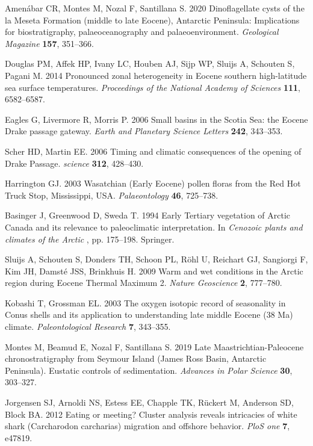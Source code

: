 \documentclass[]{rsos}%
\begin{document}
\begin{thebibliography}{99}
Amen{\'{a}}bar CR, Montes M, Nozal F, Santillana S. 2020  {Dinoflagellate cysts
  of the la Meseta Formation (middle to late Eocene), Antarctic Peninsula:
  Implications for biostratigraphy, palaeoceanography and palaeoenvironment}.
  {\em Geological Magazine} \textbf{157}, 351--366.

Douglas PM, Affek HP, Ivany LC, Houben AJ, Sijp WP, Sluijs A, Schouten S,
  Pagani M. 2014  Pronounced zonal heterogeneity in Eocene southern
  high-latitude sea surface temperatures. {\em Proceedings of the National
  Academy of Sciences} \textbf{111}, 6582--6587.

Eagles G, Livermore R, Morris P. 2006  Small basins in the Scotia Sea: the
  Eocene Drake passage gateway. {\em Earth and Planetary Science Letters}
  \textbf{242}, 343--353.

Scher HD, Martin EE. 2006  Timing and climatic consequences of the opening of
  Drake Passage. {\em science} \textbf{312}, 428--430.

Harrington GJ. 2003  {Wasatchian (Early Eocene) pollen floras from the Red Hot
  Truck Stop, Mississippi, USA}. {\em Palaeontology} \textbf{46}, 725--738.

Basinger J, Greenwood D, Sweda T. 1994  Early Tertiary vegetation of Arctic
  Canada and its relevance to paleoclimatic interpretation. In {\em Cenozoic
  plants and climates of the Arctic} ,  pp. 175--198. Springer.

Sluijs A, Schouten S, Donders TH, Schoon PL, R{\"o}hl U, Reichart GJ, Sangiorgi
  F, Kim JH, Damst{\'e} JSS, Brinkhuis H. 2009  Warm and wet conditions in the
  Arctic region during Eocene Thermal Maximum 2. {\em Nature Geoscience}
  \textbf{2}, 777--780.

Kobashi T, Grossman EL. 2003  The oxygen isotopic record of seasonality in
  Conus shells and its application to understanding late middle Eocene (38 Ma)
  climate. {\em Paleontological Research} \textbf{7}, 343--355.

Montes M, Beamud E, Nozal F, Santillana S. 2019  Late Maastrichtian-Paleocene
  chronostratigraphy from Seymour Island (James Ross Basin, Antarctic
  Peninsula). Eustatic controls of sedimentation. {\em Advances in Polar
  Science} \textbf{30}, 303--327.

Jorgensen SJ, Arnoldi NS, Estess EE, Chapple TK, R{\"u}ckert M, Anderson SD,
  Block BA. 2012  Eating or meeting? Cluster analysis reveals intricacies of
  white shark (Carcharodon carcharias) migration and offshore behavior. {\em
  PloS one} \textbf{7}, e47819.


\end{thebibliography}
\end{document}
